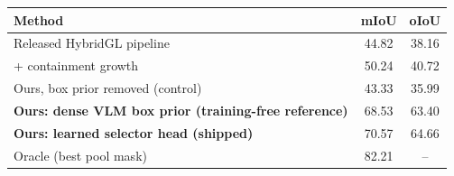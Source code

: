 \begin{tabular}{lcc}
\toprule
Method & mIoU & oIoU \\
\midrule
Released HybridGL pipeline & 44.82 & 38.16 \\
+ containment growth & 50.24 & 40.72 \\
Ours, box prior removed (control) & 43.33 & 35.99 \\
\textbf{Ours: dense VLM box prior (training-free reference)} & 68.53 & 63.40 \\
\textbf{Ours: learned selector head (shipped)} & 70.57 & 64.66 \\
\midrule
Oracle (best pool mask) & 82.21 & -- \\
\bottomrule
\end{tabular}
